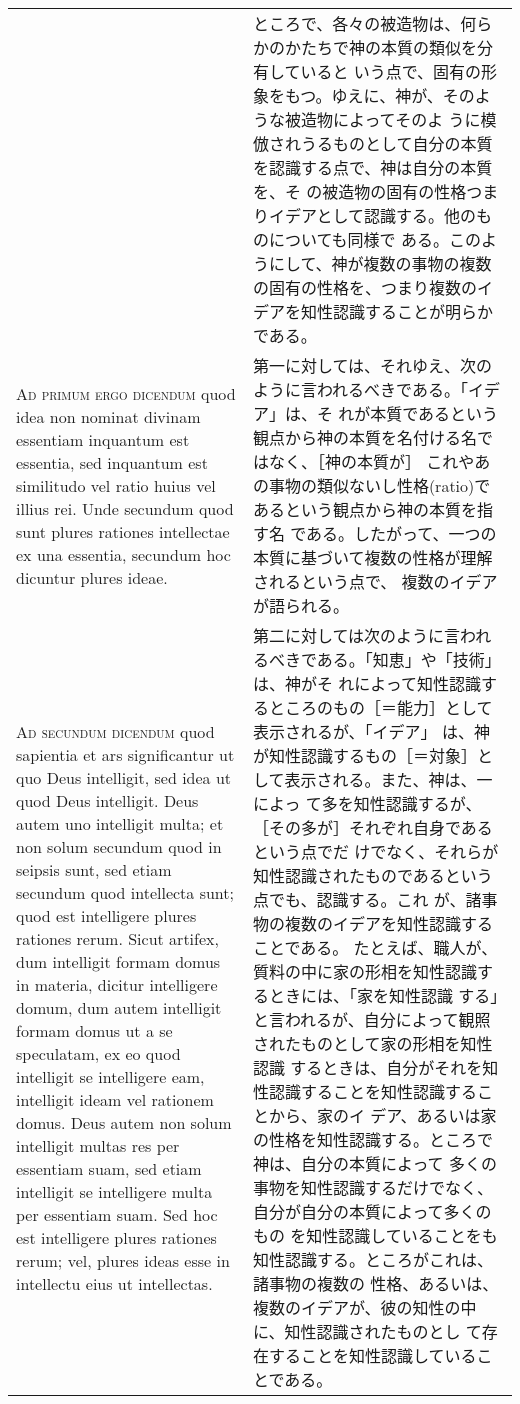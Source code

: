 \documentclass[10pt]{jsarticle} %
\begin{document}
\begin{longtable}{p{21em}p{21em}}
&

ところで、各々の被造物は、何らかのかたちで神の本質の類似を分有していると
 いう点で、固有の形象をもつ。ゆえに、神が、そのような被造物によってそのよ
 うに模倣されうるものとして自分の本質を認識する点で、神は自分の本質を、そ
 の被造物の固有の性格つまりイデアとして認識する。他のものについても同様で
 ある。このようにして、神が複数の事物の複数の固有の性格を、つまり複数のイ
 デアを知性認識することが明らかである。


\\


{\scshape Ad primum ergo dicendum} quod idea non nominat
divinam essentiam inquantum est essentia, sed inquantum est similitudo
vel ratio huius vel illius rei. Unde secundum quod sunt plures rationes
intellectae ex una essentia, secundum hoc dicuntur plures ideae.

&

第一に対しては、それゆえ、次のように言われるべきである。「イデア」は、そ
れが本質であるという観点から神の本質を名付ける名ではなく、［神の本質が］
これやあの事物の類似ないし性格(ratio)であるという観点から神の本質を指す名
である。したがって、一つの本質に基づいて複数の性格が理解されるという点で、
複数のイデアが語られる。

\\


{\scshape Ad secundum dicendum} quod sapientia et ars
significantur ut quo Deus intelligit, sed idea ut quod Deus
intelligit. Deus autem uno intelligit multa; et non solum secundum quod
in seipsis sunt, sed etiam secundum quod intellecta sunt; quod est
intelligere plures rationes rerum. Sicut artifex, dum intelligit formam
domus in materia, dicitur intelligere domum, dum autem intelligit formam
domus ut a se speculatam, ex eo quod intelligit se intelligere eam,
intelligit ideam vel rationem domus. Deus autem non solum intelligit
multas res per essentiam suam, sed etiam intelligit se intelligere multa
per essentiam suam. Sed hoc est intelligere plures rationes rerum; vel,
plures ideas esse in intellectu eius ut intellectas.

&

第二に対しては次のように言われるべきである。「知恵」や「技術」は、神がそ
れによって知性認識するところのもの［＝能力］として表示されるが、「イデア」
は、神が知性認識するもの［＝対象］として表示される。また、神は、一によっ
 て多を知性認識するが、［その多が］それぞれ自身であるという点でだ
 けでなく、それらが知性認識されたものであるという点でも、認識する。これ
 が、諸事物の複数のイデアを知性認識することである。
たとえば、職人が、質料の中に家の形相を知性認識するときには、「家を知性認識
 する」と言われるが、自分によって観照されたものとして家の形相を知性認識
 するときは、自分がそれを知性認識することを知性認識することから、家のイ
 デア、あるいは家の性格を知性認識する。ところで神は、自分の本質によって
 多くの事物を知性認識するだけでなく、自分が自分の本質によって多くのもの
 を知性認識していることをも知性認識する。ところがこれは、諸事物の複数の
 性格、あるいは、複数のイデアが、彼の知性の中に、知性認識されたものとし
 て存在することを知性認識していることである。


\end{longtable}
\end{document}
